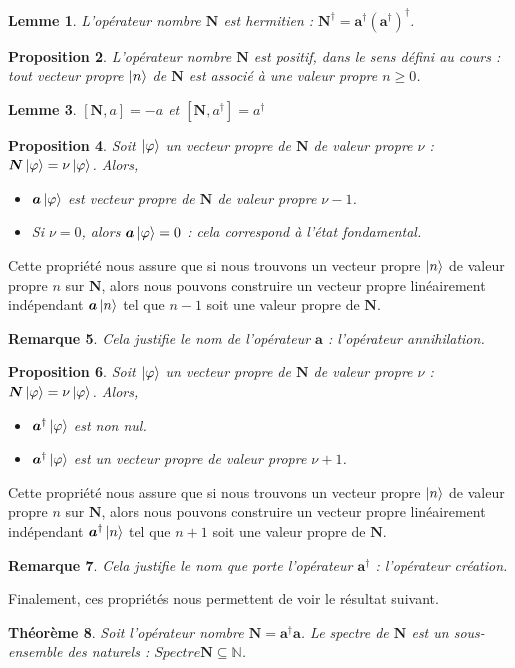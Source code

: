 \documentclass[11pt,oneside,a4paper]{article}
\newtheorem{theorem}{Théorème}[section]
\newtheorem{lemma}[theorem]{Lemme}
\newtheorem{property}[theorem]{Proposition}
\newtheorem{remark}[theorem]{Remarque}
\begin{document}
\begin{lemma}
  L'opérateur nombre $\bm{N}$ est hermitien : $\bm{N}^\dagger = \bm{a}^\dagger \left(\bm{a}^\dagger\right)^\dagger$.
\end{lemma}

\begin{property}
  L'opérateur nombre $\bm{N}$ est positif, dans le sens défini au cours : tout vecteur propre $\ket{n}$ de $\bm{N}$ est associé à une valeur propre $n\geq 0$.
\end{property}
\begin{lemma}
  $[\bm{N},a]=-a$ et $[\bm{N},a^\dagger] = a^\dagger$
\end{lemma}
\begin{property}
  \label{Vp destruction}
  Soit $\ket{\varphi}$ un vecteur propre de $\bm{N}$ de valeur propre $\nu$ : $\bm{N}\ket{\varphi} = \nu\ket{\varphi}$. Alors,
  \begin{itemize}
      \item $\bm{a}\ket{\varphi}$ est vecteur propre de $\bm{N}$ de valeur propre $\nu-1$.
      \item Si $\nu = 0$, alors $\bm{a}\ket{\varphi} = 0$ : cela correspond à l'état fondamental.
  \end{itemize}
\end{property}
Cette propriété nous assure que si nous trouvons un vecteur propre $\ket{n}$ de valeur propre $n$ sur $\bm{N}$, alors nous pouvons construire un vecteur propre linéairement indépendant $\bm{a}\ket{n}$ tel que $n-1$ soit une valeur propre de $\bm{N}$.
\begin{remark}
  Cela justifie le nom de l'opérateur $\bm{a}$ : l'opérateur annihilation.
\end{remark}
\begin{property}
  Soit $\ket{\varphi}$ un vecteur propre de $\bm{N}$ de valeur propre $\nu$ : $\bm{N}\ket{\varphi} = \nu\ket{\varphi}$. Alors,
  \begin{itemize}
      \item $\bm{a}^\dagger\ket{\varphi}$ est non nul.
      \item $\bm{a}^\dagger\ket{\varphi}$ est un vecteur propre de valeur propre $\nu+1$.
  \end{itemize}
\end{property}
Cette propriété nous assure que si nous trouvons un vecteur propre $\ket{n}$ de valeur propre $n$ sur $\bm{N}$, alors nous pouvons construire un vecteur propre linéairement indépendant $\bm{a}^\dagger\ket{n}$ tel que $n+1$ soit une valeur propre de $\bm{N}$.
\begin{remark}
  Cela justifie le nom que porte l'opérateur $\bm{a}^\dagger$ : l'opérateur création.
\end{remark}
Finalement, ces propriétés nous permettent de voir le résultat suivant.
\begin{theorem}
  Soit l'opérateur nombre $\bm{N} = \bm{a}^\dagger\bm{a}$. Le spectre de $\bm{N}$ est un sous-ensemble des naturels : $Spectre \bm{N}\subseteq\mathbb{N}$.
\end{theorem}
\end{document}
